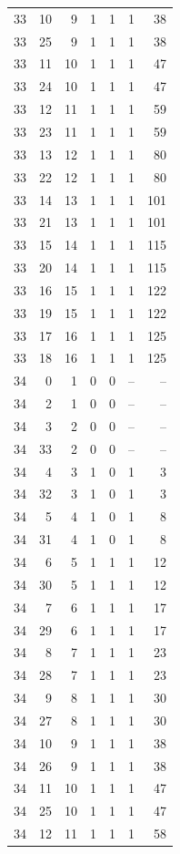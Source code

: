 \begin{longtable}{rrrrrrr}
33 & 10 & 9 & 1 & 1 & 1 & 38\\
33 & 25 & 9 & 1 & 1 & 1 & 38\\
33 & 11 & 10 & 1 & 1 & 1 & 47\\
33 & 24 & 10 & 1 & 1 & 1 & 47\\
33 & 12 & 11 & 1 & 1 & 1 & 59\\
33 & 23 & 11 & 1 & 1 & 1 & 59\\
33 & 13 & 12 & 1 & 1 & 1 & 80\\
33 & 22 & 12 & 1 & 1 & 1 & 80\\
33 & 14 & 13 & 1 & 1 & 1 & 101\\
33 & 21 & 13 & 1 & 1 & 1 & 101\\
33 & 15 & 14 & 1 & 1 & 1 & 115\\
33 & 20 & 14 & 1 & 1 & 1 & 115\\
33 & 16 & 15 & 1 & 1 & 1 & 122\\
33 & 19 & 15 & 1 & 1 & 1 & 122\\
33 & 17 & 16 & 1 & 1 & 1 & 125\\
33 & 18 & 16 & 1 & 1 & 1 & 125\\
34 & 0 & 1 & 0 & 0 & -- & --\\
34 & 2 & 1 & 0 & 0 & -- & --\\
34 & 3 & 2 & 0 & 0 & -- & --\\
34 & 33 & 2 & 0 & 0 & -- & --\\
34 & 4 & 3 & 1 & 0 & 1 & 3\\
34 & 32 & 3 & 1 & 0 & 1 & 3\\
34 & 5 & 4 & 1 & 0 & 1 & 8\\
34 & 31 & 4 & 1 & 0 & 1 & 8\\
34 & 6 & 5 & 1 & 1 & 1 & 12\\
34 & 30 & 5 & 1 & 1 & 1 & 12\\
34 & 7 & 6 & 1 & 1 & 1 & 17\\
34 & 29 & 6 & 1 & 1 & 1 & 17\\
34 & 8 & 7 & 1 & 1 & 1 & 23\\
34 & 28 & 7 & 1 & 1 & 1 & 23\\
34 & 9 & 8 & 1 & 1 & 1 & 30\\
34 & 27 & 8 & 1 & 1 & 1 & 30\\
34 & 10 & 9 & 1 & 1 & 1 & 38\\
34 & 26 & 9 & 1 & 1 & 1 & 38\\
34 & 11 & 10 & 1 & 1 & 1 & 47\\
34 & 25 & 10 & 1 & 1 & 1 & 47\\
34 & 12 & 11 & 1 & 1 & 1 & 58\\

\end{longtable}
